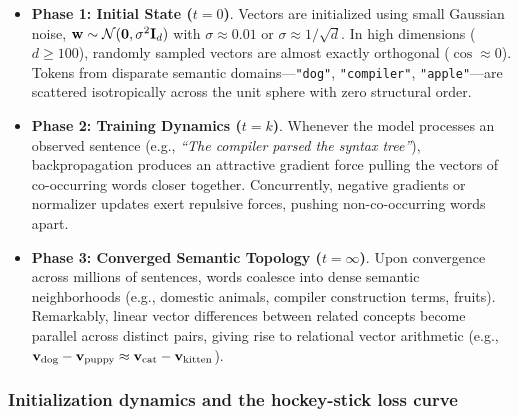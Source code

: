 \documentclass[../../../main.tex]{subfiles}
\begin{document}
\begin{itemize}
    \item \textbf{Phase 1: Initial State ($t = 0$)}. Vectors are initialized using small Gaussian noise, $\mathbf{w} \sim \mathcal{N}(\mathbf{0}, \sigma^2 \mathbf{I}_d)$ with $\sigma \approx 0.01$ or $\sigma \approx 1/\sqrt{d}$. In high dimensions ($d \ge 100$), randomly sampled vectors are almost exactly orthogonal ($\cos \approx 0$). Tokens from disparate semantic domains---\texttt{"dog"}, \texttt{"compiler"}, \texttt{"apple"}---are scattered isotropically across the unit sphere with zero structural order.
    
    \item \textbf{Phase 2: Training Dynamics ($t = k$)}. Whenever the model processes an observed sentence (e.g., \emph{``The compiler parsed the syntax tree''}), backpropagation produces an attractive gradient force pulling the vectors of co-occurring words closer together. Concurrently, negative gradients or normalizer updates exert repulsive forces, pushing non-co-occurring words apart.
    
    \item \textbf{Phase 3: Converged Semantic Topology ($t = \infty$)}. Upon convergence across millions of sentences, words coalesce into dense semantic neighborhoods (e.g., domestic animals, compiler construction terms, fruits). Remarkably, linear vector differences between related concepts become parallel across distinct pairs, giving rise to relational vector arithmetic (e.g., $\mathbf{v}_{\text{dog}} - \mathbf{v}_{\text{puppy}} \approx \mathbf{v}_{\text{cat}} - \mathbf{v}_{\text{kitten}}$).
\end{itemize}

\subsubsection{Initialization dynamics and the hockey-stick loss curve}
\label{subsec:initialization_dynamics}
\end{document}
